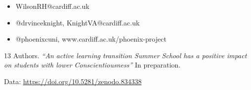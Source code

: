 \documentclass{beamer}
\begin{document}
    \begin{frame}

        \begin{itemize}
            \item WilsonRH@cardiff.ac.uk
            \item @drvinceknight, KnightVA@cardiff.ac.uk
            \item @phoenixcuni, www.cardiff.ac.uk/phoenix-project
        \end{itemize}

        \vfill

        13 Authors. \textit{``An active learning transition Summer School has a positive
        impact on students with lower
    Conscientiousness''} In preparation.

    \vfill

    Data: \url{https://doi.org/10.5281/zenodo.834338}
\end{frame}
\end{document}
